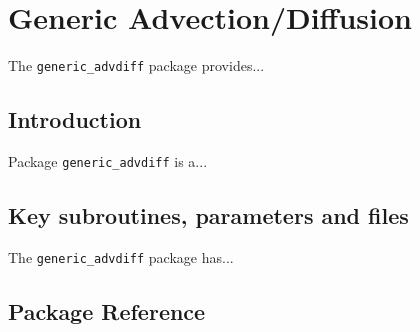

\section{Generic Advection/Diffusion}
\label{sec:pkg:gad}
The {\tt generic\_advdiff} package provides...


\subsection{Introduction}
Package {\tt generic\_advdiff} is a...


\subsection{Key subroutines, parameters and files}
\label{sec:pkg:rw:implementation_synopsis}
The {\tt generic\_advdiff} package has... 


\subsection{Package Reference}

%
